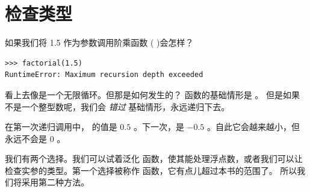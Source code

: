 

\section{检查类型}
\label{guardian}


如果我们将 1.5 作为参数调用阶乘函数 (  )会怎样？

  
  

\begin{lstlisting}
>>> factorial(1.5)
RuntimeError: Maximum recursion depth exceeded
\end{lstlisting}

%

看上去像是一个无限循环。但那是如何发生的？ 函数的基础情形是  。
但是如果  不是一个整型数呢，我们会 {\em 错过} 基础情形，永远递归下去。
  


在第一次递归调用中， 的值是 $0.5$ 。下一次，是 $-0.5$ 。自此它会越来越小，但永远不会是 $0$ 。


我们有两个选择。我们可以试着泛化  函数，使其能处理浮点数，或者我们可以让  检查实参的类型。第一个选择被称作  函数，它有点儿超过本书的范围了。 所以我们将采用第二种方法。


